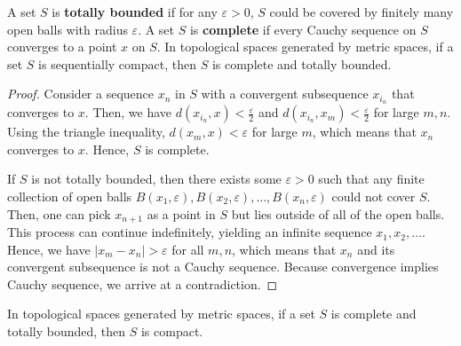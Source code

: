 \begin{theorem}
  A set \( S \) is \textbf{totally bounded} if for any \( \varepsilon > 0 \), \( S \)
  could be covered by finitely many open balls with radius \( \varepsilon \).
  A set \( S \) is \textbf{complete} if every Cauchy sequence on \( S \)
  converges to a point \( x \) on \( S \).
  In topological spaces generated by metric spaces, if a set \( S \) is
  sequentially compact, then \( S \) is complete and totally bounded.
\end{theorem}

\begin{proof}
  Consider a sequence \( x_{n} \) in \( S \) with a convergent subsequence \(
  x_{i_{n}} \) that converges to \( x \). Then, we have \( d(x_{i_{n}},x) <
  \frac{\varepsilon}{2} \) and \( d(x_{i_{n}}, x_{m}) < \frac{\varepsilon}{2} \)
  for large \( m, n \). Using the triangle inequality, \( d(x_{m}, x) <
  \varepsilon \) for large \( m \), which means that \( x_{n} \) converges to \(
  x\). Hence, \( S \) is complete.

  If \( S \) is not totally bounded, then there exists some \( \varepsilon>0 \)
  such that any finite collection of open balls \( B(x_{1}, \varepsilon),
  B(x_{2}, \varepsilon), \ldots, B(x_{n}, \varepsilon)  \) could not cover \( S
  \). Then, one can pick \( x_{n+1} \) as a point in \( S \) but lies outside of
  all of the open balls. This process can continue indefinitely, yielding an
  infinite sequence \( x_{1}, x_{2}, \ldots  \). Hence, we have
  \( |x_{m} - x_{n}| > \varepsilon \) for
  all \( m, n \), which means that \( x_{n} \) and its convergent subsequence is
  not a Cauchy sequence. Because convergence implies Cauchy sequence, we arrive
  at a contradiction.
\end{proof}

\begin{theorem}
  In topological spaces generated by metric spaces, if a set \( S \) is complete
  and totally bounded, then \( S \) is compact.
\end{theorem}

